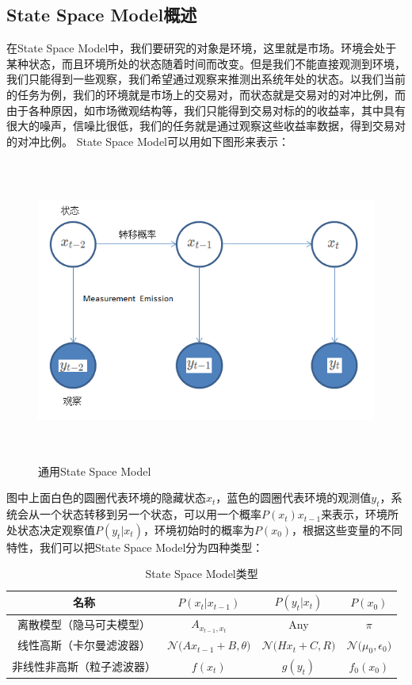 \subsection{State Space Model概述}
在State Space Model中，我们要研究的对象是环境，这里就是市场。环境会处于某种状态，而且环境所处的状态随着时间而改变。但是我们不能直接观测到环境，我们只能得到一些观察，我们希望通过观察来推测出系统年处的状态。以我们当前的任务为例，我们的环境就是市场上的交易对，而状态就是交易对的对冲比例，而由于各种原因，如市场微观结构等，我们只能得到交易对标的的收益率，其中具有很大的噪声，信噪比很低，我们的任务就是通过观察这些收益率数据，得到交易对的对冲比例。
State Space Model可以用如下图形来表示：
\begin{figure}[H]
	\caption{通用State Space Model}
	\label{f000054}
	\centering
	\includegraphics[height=10cm]{images/f000054}
\end{figure}
图中上面白色的圆圈代表环境的隐藏状态$x_{t}$，蓝色的圆圈代表环境的观测值$y_{t}$，系统会从一个状态转移到另一个状态，可以用一个概率$P(x_{t})x_{t-1}$来表示，环境所处状态决定观察值$P(y_{t} \vert x_{t})$，环境初始时的概率为$P(x_{0})$，根据这些变量的不同特性，我们可以把State Space Model分为四种类型：
\begin{table}[H]
\caption{State Space Model类型}
\label{t000001}
\begin{tabular}{|c|c|c|c|} \hline
名称 & $P(x_{t} \vert x_{t-1})$ & $P(y_{t} \vert x_{t})$ & $P(x_{0})$ \\ \hline  
离散模型（隐马可夫模型） & $A_{x_{t-1}, x_{t}}$ & Any & $\pi$ \\ \hline
线性高斯（卡尔曼滤波器） & $\mathcal{N}\big(  Ax_{t-1}+B, \theta \big)$ & $\mathcal{N}\big(  Hx_{t}+C, R \big)$ & $\mathcal{N}\big(  \mu _{0}, \epsilon _{0} \big)$ \\ \hline
非线性非高斯（粒子滤波器） & $f(x_{t})$ & $g(y_{t})$ & $f_{0}(x_{0})$\\ \hline
\end{tabular}
\end{table}
